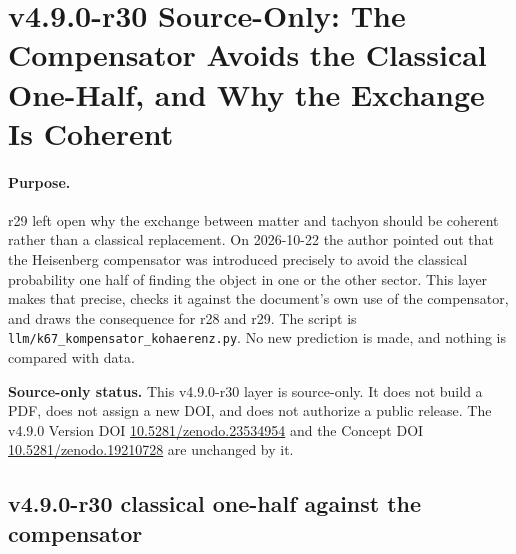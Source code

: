\clearpage
\section*{v4.9.0-r30 Source-Only: The Compensator Avoids the Classical One-Half, and Why the Exchange Is Coherent}
\label{sec:v490-r30-compensator-coherence}

\paragraph{Purpose.}
r29 left open why the exchange between matter and tachyon should be coherent rather than a classical replacement.  On 2026-10-22
the author pointed out that the Heisenberg compensator was introduced precisely to avoid the classical probability one half of
finding the object in one or the other sector.  This layer makes that precise, checks it against the document's own use of the
compensator, and draws the consequence for r28 and r29.  The script is \texttt{llm/k67\_kompensator\_kohaerenz.py}.  No new
prediction is made, and nothing is compared with data.

\noindent\textbf{Source-only status.}
This v4.9.0-r30 layer is source-only.  It does not build a PDF, does not assign a new DOI,
and does not authorize a public release.  The v4.9.0 Version DOI
\href{https://doi.org/10.5281/zenodo.23534954}{10.5281/zenodo.23534954} and the Concept DOI
\href{https://doi.org/10.5281/zenodo.19210728}{10.5281/zenodo.19210728} are unchanged by it.

\subsection*{v4.9.0-r30 classical one-half against the compensator}
\label{subsec:v490-r30-one-half}

